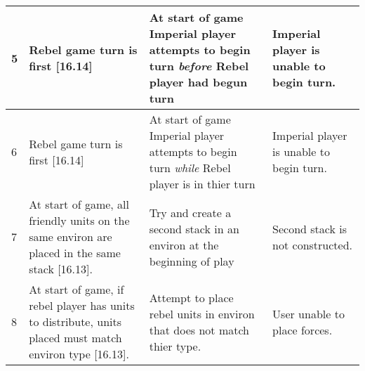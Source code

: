 \begin{center}
\begin{longtable}{| p{.5cm} | p{4.5cm} | p{4.5cm} | p{4.5cm} |}
    \\ \hline

    5 &
    Rebel game turn is first [16.14] &

    At start of game Imperial player attempts to begin turn
    \textit{before} Rebel player had begun turn &
    
    Imperial player is unable to begin turn.

    \\ \hline 

    6 &
    Rebel game turn is first [16.14] &

    At start of game Imperial player attempts to begin turn
    \textit{while} Rebel player is in thier turn &

    Imperial player is unable to begin turn.

    \\ \hline 

    7 &

    At start of game, all friendly units on the same environ are
    placed in the same stack [16.13]. &

    Try and create a second stack in an environ at the beginning of
    play &

    Second stack is not constructed.

    \\ \hline

    8 &

    At start of game, if rebel player has units to distribute, units
    placed must match environ type [16.13]. &

    Attempt to place rebel units in environ that does not match thier
    type. &

    User unable to place forces.

    \\ \hline 

  \end{longtable}

\end{center}
